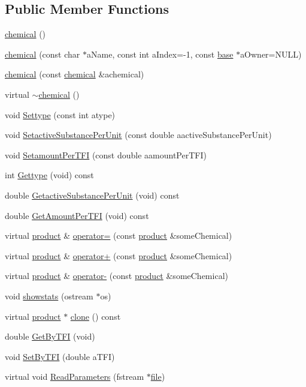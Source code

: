 \subsection*{Public Member Functions}
\begin{DoxyCompactItemize}
\item 
\hyperlink{classchemical_af734c449b8e918db03241008b6571743}{chemical} ()
\item 
\hyperlink{classchemical_a2d697470e1e62aee94b221d27dc6ab7f}{chemical} (const char $\ast$aName, const int aIndex=-\/1, const \hyperlink{classbase}{base} $\ast$aOwner=NULL)
\item 
\hyperlink{classchemical_a3e96e0469b288d962307fc6a89801262}{chemical} (const \hyperlink{classchemical}{chemical} \&achemical)
\item 
virtual \hyperlink{classchemical_ae60ef5faf85286058349de11ae1c7a5a}{$\sim$chemical} ()
\item 
void \hyperlink{classchemical_ad86d720d3a4f1a2d8afa1ef4d53c566b}{Settype} (const int atype)
\item 
void \hyperlink{classchemical_a3e09b6a3cbd7afe01c1bcd730270d8e1}{SetactiveSubstancePerUnit} (const double aactiveSubstancePerUnit)
\item 
void \hyperlink{classchemical_a501dcbea3e3489ec64c4b2f2b998da14}{SetamountPerTFI} (const double aamountPerTFI)
\item 
int \hyperlink{classchemical_ae66c160476435100ad1596cf55553073}{Gettype} (void) const 
\item 
double \hyperlink{classchemical_a084ecbb27d06ec9559e4c3592f99f2d6}{GetactiveSubstancePerUnit} (void) const 
\item 
double \hyperlink{classchemical_aefba936b8096f1c54f497d743befa4bf}{GetAmountPerTFI} (void) const 
\item 
virtual \hyperlink{classproduct}{product} \& \hyperlink{classchemical_a2fb689080661790a2900f7000425e848}{operator=} (const \hyperlink{classproduct}{product} \&someChemical)
\item 
virtual \hyperlink{classproduct}{product} \& \hyperlink{classchemical_afd86e5c4798e2eb77e9705a36aa3f5f9}{operator+} (const \hyperlink{classproduct}{product} \&someChemical)
\item 
virtual \hyperlink{classproduct}{product} \& \hyperlink{classchemical_a1ec6784955496e6b0b9199c20bbeb12b}{operator-\/} (const \hyperlink{classproduct}{product} \&someChemical)
\item 
void \hyperlink{classchemical_abad5f5665261d29f099d3defdac9364d}{showstats} (ostream $\ast$os)
\item 
virtual \hyperlink{classproduct}{product} $\ast$ \hyperlink{classchemical_aee0689e71b3bfe7f7dbd91009b707fd5}{clone} () const 
\item 
double \hyperlink{classchemical_aa62a63c584384fa781c473897889ee05}{GetByTFI} (void)
\item 
void \hyperlink{classchemical_a433a3abccb92ef058848eb9e6799934c}{SetByTFI} (double aTFI)
\item 
virtual void \hyperlink{classchemical_acfdd25cd02bb7b5cd41e2daf5e890f7d}{ReadParameters} (fstream $\ast$\hyperlink{classbase_a3af52ee9891719d09b8b19b42450b6f6}{file})
\end{DoxyCompactItemize}
